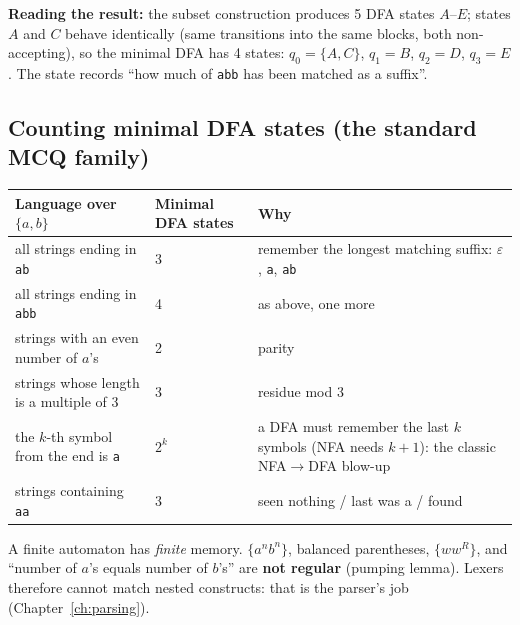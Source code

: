 \documentclass[10pt,a4paper,openany,oneside]{report}
\begin{document}
\begin{center}
\end{center}
\textbf{Reading the result:} the subset construction produces 5 DFA states $A$--$E$; states $A$ and $C$ behave identically (same transitions into the same blocks, both non-accepting), so the minimal DFA has 4 states: $q_0=\{A,C\}$, $q_1=B$, $q_2=D$, $q_3=E$. The state records ``how much of \texttt{abb} has been matched as a suffix''.

\subsection{Counting minimal DFA states (the standard MCQ family)}
\begin{center}\small
\begin{xltabular}{\textwidth}{@{}L{6.8cm}C{2.4cm}Y@{}}
\toprule
\textbf{Language over $\{a,b\}$} & \textbf{Minimal DFA states} & \textbf{Why}\\
\midrule\endhead
all strings ending in \texttt{ab} & 3 & remember the longest matching suffix: $\varepsilon$, \texttt{a}, \texttt{ab}\\
all strings ending in \texttt{abb} & 4 & as above, one more\\
strings with an even number of $a$'s & 2 & parity\\
strings whose length is a multiple of 3 & 3 & residue mod 3\\
the $k$-th symbol from the end is \texttt{a} & $2^k$ & a DFA must remember the last $k$ symbols (NFA needs $k+1$): the classic NFA$\to$DFA blow-up\\
strings containing \texttt{aa} & 3 & seen nothing / last was a / found\\
\bottomrule
\end{xltabular}
\end{center}
\begin{trapbox}
A finite automaton has \emph{finite} memory. $\{a^nb^n\}$, balanced parentheses, $\{ww^R\}$, and ``number of $a$'s equals number of $b$'s'' are \textbf{not regular} (pumping lemma). Lexers therefore cannot match nested constructs: that is the parser's job (Chapter~\ref{ch:parsing}).
\end{trapbox}
\end{document}
